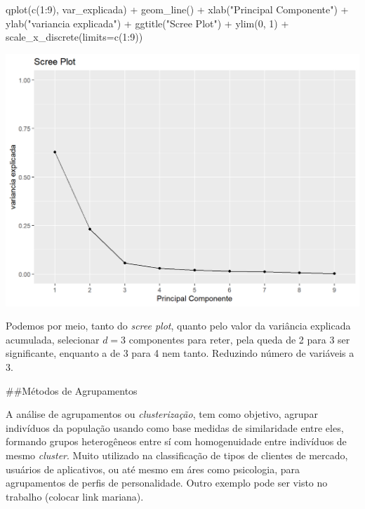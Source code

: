 \documentclass[
  letterpaper,
  DIV=11,
  numbers=noendperiod]{scrreprt}
\newenvironment{Shaded}{\begin{snugshade}}{\end{snugshade}}
\newcommand{\AttributeTok}[1]{\textcolor[rgb]{0.40,0.45,0.13}{#1}}
\newcommand{\DecValTok}[1]{\textcolor[rgb]{0.68,0.00,0.00}{#1}}
\newcommand{\FunctionTok}[1]{\textcolor[rgb]{0.28,0.35,0.67}{#1}}
\newcommand{\NormalTok}[1]{\textcolor[rgb]{0.00,0.23,0.31}{#1}}
\newcommand{\SpecialCharTok}[1]{\textcolor[rgb]{0.37,0.37,0.37}{#1}}
\newcommand{\StringTok}[1]{\textcolor[rgb]{0.13,0.47,0.30}{#1}}
\begin{document}
\begin{Shaded}
\begin{Highlighting}[]
\FunctionTok{qplot}\NormalTok{(}\FunctionTok{c}\NormalTok{(}\DecValTok{1}\SpecialCharTok{:}\DecValTok{9}\NormalTok{), var\_explicada) }\SpecialCharTok{+} 
  \FunctionTok{geom\_line}\NormalTok{() }\SpecialCharTok{+} 
  \FunctionTok{xlab}\NormalTok{(}\StringTok{"Principal Componente"}\NormalTok{) }\SpecialCharTok{+} 
  \FunctionTok{ylab}\NormalTok{(}\StringTok{"variancia explicada"}\NormalTok{) }\SpecialCharTok{+}
  \FunctionTok{ggtitle}\NormalTok{(}\StringTok{"Scree Plot"}\NormalTok{) }\SpecialCharTok{+}
  \FunctionTok{ylim}\NormalTok{(}\DecValTok{0}\NormalTok{, }\DecValTok{1}\NormalTok{) }\SpecialCharTok{+} 
  \FunctionTok{scale\_x\_discrete}\NormalTok{(}\AttributeTok{limits=}\FunctionTok{c}\NormalTok{(}\DecValTok{1}\SpecialCharTok{:}\DecValTok{9}\NormalTok{))}
\end{Highlighting}
\end{Shaded}

\includegraphics{./figuras_naosupervisionado/unnamed-chunk-4-1.png}

Podemos por meio, tanto do \emph{scree plot}, quanto pelo valor da
variância explicada acumulada, selecionar \(d= 3\) componentes para
reter, pela queda de 2 para 3 ser significante, enquanto a de 3 para 4
nem tanto. Reduzindo número de variáveis a 3.

\#\#Métodos de Agrupamentos

A análise de agrupamentos ou \emph{clusterização}, tem como objetivo,
agrupar indivíduos da população usando como base medidas de similaridade
entre eles, formando grupos heterogêneos entre sí com homogenuidade
entre indivíduos de mesmo \emph{cluster}. Muito utilizado na
classificação de tipos de clientes de mercado, usuários de aplicativos,
ou até mesmo em áres como psicologia, para agrupamentos de perfis de
personalidade. Outro exemplo pode ser visto no trabalho (colocar link
mariana).
\end{document}
